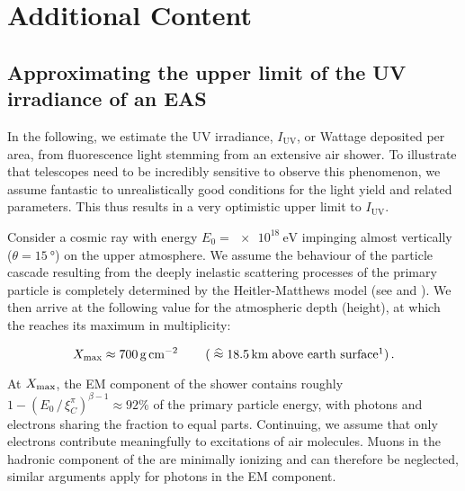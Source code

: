 
\chapter{Additional Content}
\label{app:other}

\section{Approximating the upper limit of the UV irradiance of an EAS}
\label{app:cr-uv-irradiance}

In the following, we estimate the UV irradiance, $I_\text{UV}$, or Wattage 
deposited per area, from fluorescence light stemming from an extensive air 
shower. To illustrate that telescopes need to be incredibly sensitive to 
observe this phenomenon, we assume fantastic to unrealistically good conditions
for the \UV light yield and related parameters. This thus results in a very 
optimistic upper limit to $I_\text{UV}$.

Consider a cosmic ray with energy $E_0 = \SI{e18}{\eV}$ impinging almost 
vertically ($\theta=\SI{15}{\degree}$) on the upper 
atmosphere. We assume the behaviour of the particle cascade resulting from the 
deeply inelastic scattering processes of the primary particle is completely 
determined by the Heitler-Matthews model (see  and 
\cite{Matthews2005, Risse2006}). We then arrive at the following value for the 
atmospheric depth (height), at which the \EAS reaches its maximum in 
multiplicity:

\begin{equation}
\label{eq:irradiance-multiplicity}
\Xmax \approx \SI{700}{\gram\per\centi\meter\squared}\qquad\left(\;\widehat{\approx}\;\SI{18.5}{\kilo\meter}\;\text{above earth surface}\footnotemark\right).
\end{equation}

At $X_\mathrm{max}$, the EM component of the shower contains roughly
$1-\left(E_0\,/\,\xi^\pi_C\right)^{\beta-1}\approx92\%$ of the primary particle 
energy, with photons and electrons sharing the fraction to equal parts.
Continuing, we assume that only electrons contribute meaningfully to excitations
of air molecules. Muons in the hadronic component of the \EAS are minimally 
ionizing and can therefore be neglected, similar arguments apply for photons in 
the EM component.

